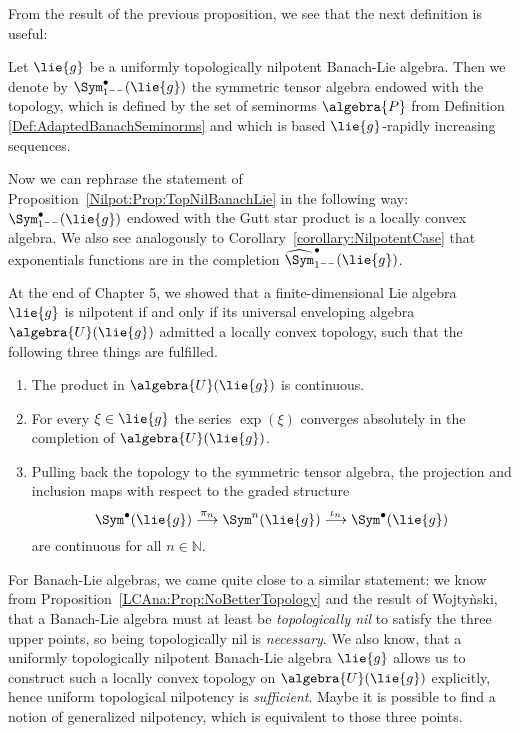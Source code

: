 From the result of the previous proposition, we see that the next definition is 
useful:
\begin{definition}
	Let $\lie{g}$ be a uniformly topologically nilpotent Banach-Lie algebra.
	Then we denote by $\Sym_{1^{--}}^{\bullet}(\lie{g})$ the symmetric tensor 
	algebra endowed with the topology, which is defined by the set of seminorms 
	$\algebra{P}$ from Definition \ref{Def:AdaptedBanachSeminorms} and which is 
	based $\lie{g}$-rapidly increasing sequences.
\end{definition}
Now we can rephrase the statement of Proposition~\ref{Nilpot:Prop:TopNilBanachLie} 
in the following way: $\Sym_{1^{--}}^{\bullet}(\lie{g})$ endowed with the Gutt 
star product is a locally convex algebra. We also see analogously to 
Corollary~\ref{corollary:NilpotentCase} that exponentials functions are in the 
completion $\widehat{\Sym}_{1^{--}}^{\bullet}(\lie{g})$.


At the end of Chapter 5, we showed that a finite-dimensional Lie algebra 
$\lie{g}$ is nilpotent if and only if its universal enveloping algebra 
$\algebra{U}(\lie{g})$ admitted a locally convex topology, such that the 
following three things are fulfilled.
\begin{enumerate}
	\item
	The product in $\algebra{U}(\lie{g})$ is continuous.

	\item
	For every $\xi \in \lie{g}$ the series $\exp(\xi)$ converges 
	absolutely in the completion of $\algebra{U}(\lie{g})$.

	\item
	Pulling back the topology to the symmetric tensor algebra, the projection 
	and inclusion maps with respect to the graded structure
	\begin{equation*}
		\Sym^{\bullet}(\lie{g})
    		\ot{$\pi_n$}{\longrightarrow}
   	    		\Sym^n(\lie{g})
    	    	\ot{$\iota_n$}{\longrightarrow}
    		\Sym^{\bullet}(\lie{g})
	\end{equation*}
	are continuous for all $n \in \mathbb{N}$.
\end{enumerate}
For Banach-Lie algebras, we came quite close to a similar statement: we know 
from Proposition~\ref{LCAna:Prop:NoBetterTopology} and the result of 
Wojty\`nski, that a Banach-Lie algebra must at least be \emph{topologically 
nil} to satisfy the three upper points, so being topologically nil is 
\emph{necessary}. We also know, that a uniformly topologically nilpotent 
Banach-Lie algebra $\lie{g}$ allows us to construct such a locally convex topology 
on $\algebra{U}(\lie{g})$ explicitly, hence uniform topological nilpotency is 
\emph{sufficient}. Maybe it is possible to find a notion of generalized 
nilpotency, which is equivalent to those three points.
